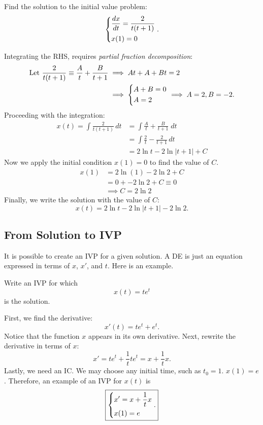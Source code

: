 \documentclass[11pt,letterpaper]{article}
\begin{document}
\begin{example}[3]{    
Find the solution to the initial value problem:
\[
\begin{dcases}
    \frac{dx}{dt}= \frac{2}{t(t+1)}\\
    x(1) = 0
\end{dcases}.
\]
}

Integrating the RHS, requires \textit{partial fraction decomposition}:
\begin{align*}
\text{Let } \frac{2}{t(t+1)} \equiv \frac{A}{t}+ \frac{B}{t+1} &\implies At+A+Bt=2\\
                                                  &\implies \begin{dcases}
                                                      A+B=0\\
                                                      A=2
                                                  \end{dcases}\implies A=2,B=-2.
\end{align*}
Proceeding with the integration:
\begin{align*}    
x(t) = \int \frac{2}{t(t+1)}\,dt &= \int\frac{A}{t}+ \frac{B}{t+1} \;dt\\ 
    &=\int\frac{2}{t}- \frac{2}{t+1}\,dt\\
    &=2\ln t-2\ln|t+1|+C
\end{align*}
Now we apply the initial condition $x(1)=0$ to find the value of $C$. 
\begin{align*}    
x(1) &=2\ln (1)-2\ln2+C\\
 &=0+ -2\ln2 +C \equiv 0 \\
&\implies  C = 2\ln2
\end{align*}
Finally, we write the solution with the value of $C$:
\[
\boxed{
x(t) =2\ln t-2\ln|t+1|-2\ln 2.
}
\]
\end{example}

\subsection{From Solution to IVP}

It is possible to create an IVP for a given solution. A DE is just an equation expressed in terms of $x$, $x'$, and $t$. Here is an example. 

\begin{example}[4]{
Write an IVP for which  
\[ x(t) = te^t\]
is the solution. 
}
    
First, we find the derivative:
\[
    x'(t) = te^t + e^t.
\]
Notice that the function $x$ appears in its own derivative. 
Next, rewrite the derivative in terms of $x$:
\[
x' = te^t + \frac{1}{t} te^t = x + \frac{1}{t}x.
\]
Lastly, we need an IC. We may choose any initial time, such as $t_0=1$. $x(1)=e$. Therefore, an example of an IVP for $x(t)$ is
\[
\boxed{
\begin{dcases}
    x' = x + \frac{1}{t}x\\
    x(1)=e
\end{dcases}.
}
\]
\end{example}
\end{document}
